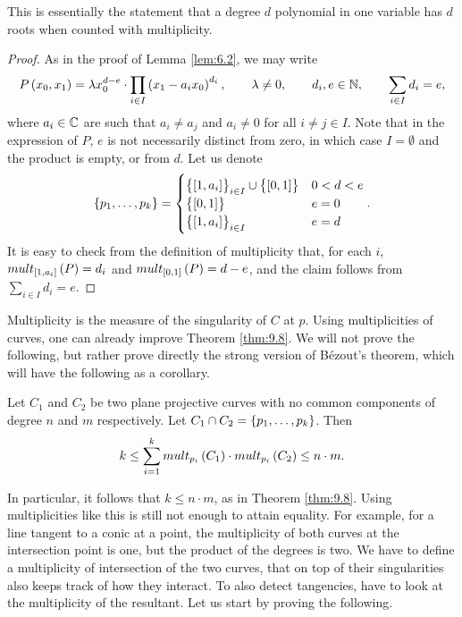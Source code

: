 \pagebreak

This is essentially the statement that a degree $ d $ polynomial in one variable has $ d $ roots when counted with multiplicity.

\begin{proof}
As in the proof of Lemma \ref{lem:6.2}, we may write
$$ P\br{x_0, x_1} = \lambda x_0^{d - e} \cdot \prod_{i \in I} \br{x_1 - a_ix_0}^{d_i}, \qquad \lambda \ne 0, \qquad d_i, e \in \N, \qquad \sum_{i \in I} d_i = e, $$
where $ a_i \in \mathbb{C} $ are such that $ a_i \ne a_j $ and $ a_i \ne 0 $ for all $ i \ne j \in I $. Note that in the expression of $ P $, $ e $ is not necessarily distinct from zero, in which case $ I = \emptyset $ and the product is empty, or from $ d $. Let us denote
$$ \cbr{p_1, \dots, p_k} =
\begin{cases}
\cbr{\sbr{1, a_i}}_{i \in I} \cup \cbr{\sbr{0, 1}} & 0 < d < e \\
\cbr{\sbr{0, 1}} & e = 0 \\
\cbr{\sbr{1, a_i}}_{i \in I} & e = d
\end{cases}.
$$
It is easy to check from the definition of multiplicity that, for each $ i $, $ mult_{\sbr{1, a_i}}\br{P} = d_i $ and $ mult_{\sbr{0, 1}}\br{P} = d - e $, and the claim follows from $ \sum_{i \in I} d_i = e $.
\end{proof}


Multiplicity is the measure of the singularity of $ C $ at $ p $. Using multiplicities of curves, one can already improve Theorem \ref{thm:9.8}. We will not prove the following, but rather prove directly the strong version of B\'ezout's theorem, which will have the following as a corollary.

\begin{theorem}
\label{thm:11.6}
Let $ C_1 $ and $ C_2 $ be two plane projective curves with no common components of degree $ n $ and $ m $ respectively. Let $ C_1 \cap C_2 = \cbr{p_1, \dots, p_k} $. Then
$$ k \le \sum_{i = 1}^k mult_{p_i}\br{C_1} \cdot mult_{p_i}\br{C_2} \le n \cdot m. $$
\end{theorem}

In particular, it follows that $ k \le n \cdot m $, as in Theorem \ref{thm:9.8}. Using multiplicities like this is still not enough to attain equality. For example, for a line tangent to a conic at a point, the multiplicity of both curves at the intersection point is one, but the product of the degrees is two. We have to define a multiplicity of intersection of the two curves, that on top of their singularities also keeps track of how they interact. To also detect tangencies, have to look at the multiplicity of the resultant. Let us start by proving the following.


